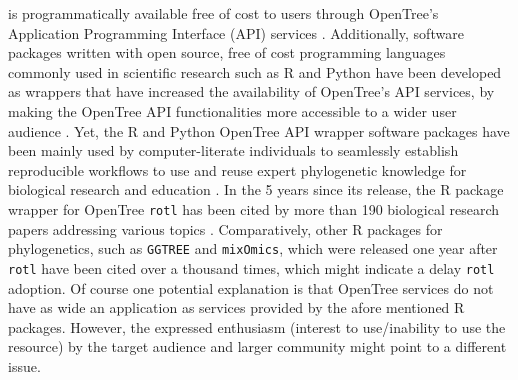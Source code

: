 \documentclass[12pt]{article}
\begin{document}
is programmatically
available free of cost to users through OpenTree's Application Programming Interface
(API) services \citep{opentreeAPIs}.
Additionally, software packages written with open source, free of cost programming
languages commonly used in scientific research such as R and Python
\citep{baker2017scientific} have been developed as wrappers that have increased the availability
of OpenTree's API services, by making the OpenTree API functionalities more accessible
to a wider user audience \citep{michonneau2016rotl, mctavish2021opentree}.
Yet, the R and Python OpenTree API wrapper software packages have been mainly used
by computer-literate individuals
to seamlessly establish reproducible workflows to use and reuse expert phylogenetic
knowledge for biological research \citep{sanchez2019datelife, sanchez2021physcraper}
and education \citep{nguyen2020phylotastic, phylotasticedtools, galacticedtools}.
In the 5 years since its release, the R package wrapper for OpenTree \texttt{rotl}
has been cited by more than 190 biological research papers addressing various
topics \citep{googlerotl}.
Comparatively, other R packages for phylogenetics, such as \texttt{GGTREE}
and \texttt{mixOmics}, which were released one year after \texttt{rotl} have been
cited over a thousand times, which might indicate a delay \texttt{rotl}
adoption. Of course one potential explanation is that OpenTree services do not have
as wide an application as services provided by the afore mentioned R packages.
However, the
expressed enthusiasm (interest to use/inability to use the resource) by the target
 audience and larger community might point to a different issue.
\end{document}
